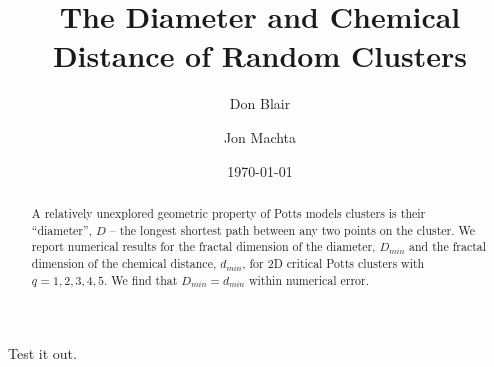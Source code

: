 \documentclass[pre,preprint]{revtex4}
\begin{document}
\title{The Diameter and Chemical Distance of Random Clusters}

\author{Don Blair}
\author{Jon Machta}

\date{\today}

\begin{abstract}
A relatively unexplored geometric property of Potts models clusters is their ``diameter'', $D$ -- the longest shortest path between any two points on the cluster. We report numerical results for the fractal dimension of the diameter, $D_{min}$ and the fractal dimension of the chemical distance, $d_{min}$, for 2D critical Potts clusters with $q=1,2,3,4,5$. We find that $D_{min} = d_{min}$ within numerical error.
\end{abstract}
\maketitle

Test it out.
\end{document}
